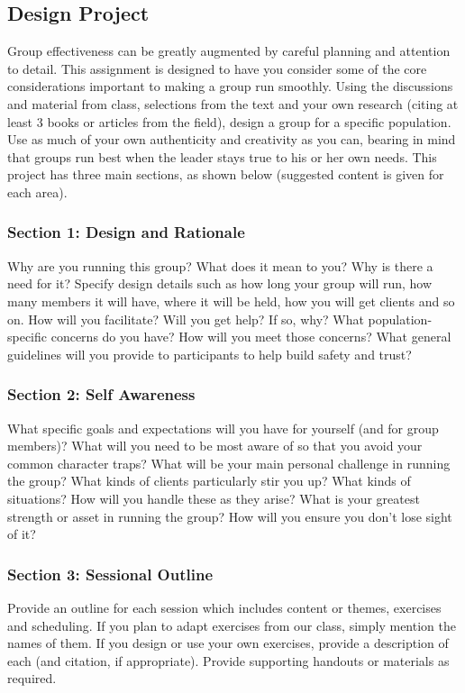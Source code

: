 \documentclass[letterpaper,10pt,headsepline]{scrreprt}
\begin{document}
\subsection{Design Project}
Group effectiveness can be greatly augmented by careful planning and attention to detail. This assignment is designed to have you consider some of the core considerations important to making a group run smoothly. Using the discussions and material from class, selections from the text and your own research (citing at least 3 books or articles from the field), design a group for a specific population. Use as much of your own authenticity and creativity as you can, bearing in mind that groups run best when the leader stays true to his or her own needs. This project has three main sections, as shown below (suggested content is given for each area).

\subsubsection{Section 1: Design and Rationale}
Why are you running this group? What does it mean to you? Why is there a need for it? Specify design details such as how long your group will run, how many members it will have, where it will be held, how you will get clients and so on. How will you facilitate? Will you get help? If so, why? What population-specific concerns do you have? How will you meet those concerns? What general guidelines will you provide to participants to help build safety and trust?

\subsubsection{Section 2: Self Awareness}
What specific goals and expectations will you have for yourself (and for group members)? What will you need to be most aware of so that you avoid your common character traps? What will be your main personal challenge in running the group? What kinds of clients particularly stir you up? What kinds of situations? How will you handle these as they arise? What is your greatest strength or asset in running the group? How will you ensure you don't lose sight of it?

\subsubsection{Section 3: Sessional Outline}
Provide an outline for each session which includes content or themes, exercises and scheduling. If you plan to adapt exercises from our class, simply mention the names of them. If you design or use your own exercises, provide a description of each (and citation, if appropriate). Provide supporting handouts or materials as required.
\end{document}
